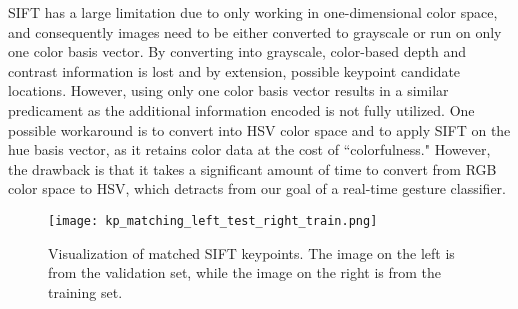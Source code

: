 SIFT has a large limitation due to only working in one-dimensional color space, and consequently images need to be either converted to grayscale or run on only one color basis vector. By converting into grayscale, color-based depth and contrast information is lost and by extension, possible keypoint candidate locations. However, using only one color basis vector results in a similar predicament as the additional information encoded is not fully utilized. One possible workaround is to convert into HSV color space and to apply SIFT on the hue basis vector, as it retains color data at the cost of ``colorfulness." However, the drawback is that it takes a significant amount of time to convert from RGB color space to HSV, which detracts from our goal of a real-time gesture classifier.

\begin{figure}[h]
\texttt{[image: kp\_matching\_left\_test\_right\_train.png]}
\centering
\caption{Visualization of matched SIFT keypoints. The image on the left is from the validation set, while the image on the right is from the training set.}
\label{sift_kp_matching}
\end{figure}